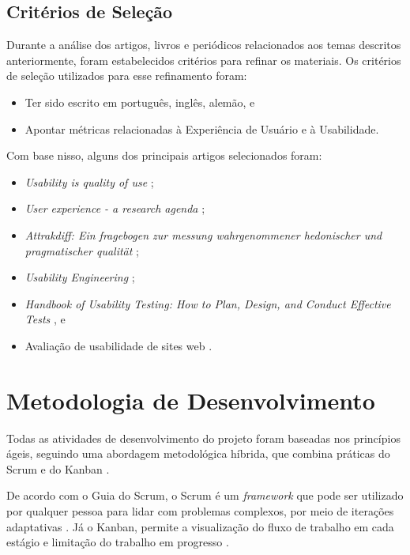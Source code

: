 \subsection{Critérios de Seleção}
\label{sec:Critérios de Selecao}
Durante a análise dos artigos, livros e periódicos relacionados aos temas descritos anteriormente, foram estabelecidos critérios para refinar os materiais. Os critérios de seleção utilizados para esse refinamento foram:

\begin{itemize}
	\item Ter sido escrito em português, inglês, alemão, e
	\item Apontar métricas relacionadas à Experiência de Usuário e à Usabilidade.
\end{itemize}

Com base nisso, alguns dos principais artigos selecionados foram:

\begin{itemize}
	\item \textit{Usability is quality of use} \cite{bevan1995};
	\item \textit{User experience - a research agenda} \cite{hassenzahl2006};
	\item \textit{Attrakdiff: Ein fragebogen zur messung wahrgenommener hedonischer und pragmatischer qualität} \cite{hassenzahl2003};
	\item \textit{Usability Engineering} \cite{nielsen1994usability};
	\item \textit{Handbook of Usability Testing: How to Plan, Design, and Conduct Effective Tests} \cite{rubin2011}, e
	\item Avaliação de usabilidade de sites web \cite{winckler2022}.
\end{itemize}

\section{Metodologia de Desenvolvimento}
\label{sec:Metodologia de Desenvolvimento}
Todas as atividades de desenvolvimento do projeto foram baseadas nos princípios ágeis, seguindo uma abordagem metodológica híbrida, que combina práticas do Scrum e do Kanban \cite{totvs2021} \cite{scrumguide2020}. 

De acordo com o Guia do Scrum, o Scrum é um \textit{framework} que pode ser utilizado por qualquer pessoa para lidar com problemas complexos, por meio de iterações adaptativas \cite{scrumguide2020}. Já o Kanban, permite 
a visualização do fluxo de trabalho em cada estágio e limitação do trabalho em progresso \cite{anderson2011}.

